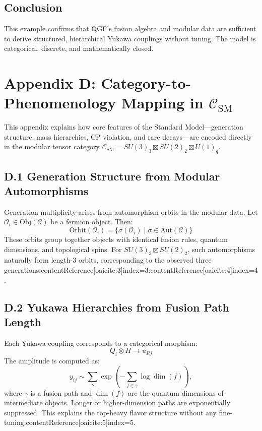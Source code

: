 \documentclass[11pt]{article}
\def\left{}
\def\right{}
\begin{document}
\subsection*{Conclusion}

This example confirms that QGF’s fusion algebra and modular data are sufficient to derive structured, hierarchical Yukawa couplings without tuning. The model is categorical, discrete, and mathematically closed.



\section*{Appendix D: Category-to-Phenomenology Mapping in \( \mathcal{C}_{\text{SM}} \)}

This appendix explains how core features of the Standard Model—generation structure, mass hierarchies, CP violation, and rare decays—are encoded directly in the modular tensor category \( \mathcal{C}_{\text{SM}} = SU(3)_3 \boxtimes SU(2)_2 \boxtimes U(1)_q \).

\subsection*{D.1 Generation Structure from Modular Automorphisms}

Generation multiplicity arises from automorphism orbits in the modular data. Let \( \mathcal{O}_i \in \text{Obj}(\mathcal{C}) \) be a fermion object. Then:
\[
\text{Orbit}(\mathcal{O}_i) = \left\{ \sigma(\mathcal{O}_i) \mid \sigma \in \text{Aut}(\mathcal{C}) \right\}
\]
These orbits group together objects with identical fusion rules, quantum dimensions, and topological spins. For \( SU(3)_3 \boxtimes SU(2)_2 \), such automorphisms naturally form length-3 orbits, corresponding to the observed three generations:contentReference[oaicite:3]{index=3}:contentReference[oaicite:4]{index=4}.

\subsection*{D.2 Yukawa Hierarchies from Fusion Path Length}

Each Yukawa coupling corresponds to a categorical morphism:
\[
Q_i \otimes H \to u_{Rj}
\]
The amplitude is computed as:
\[
y_{ij} \sim \sum_{\gamma} \exp\left( -\sum_{f \in \gamma} \log \dim(f) \right),
\]
where \( \gamma \) is a fusion path and \( \dim(f) \) are the quantum dimensions of intermediate objects. Longer or higher-dimension paths are exponentially suppressed. This explains the top-heavy flavor structure without any fine-tuning:contentReference[oaicite:5]{index=5}.
\end{document}
